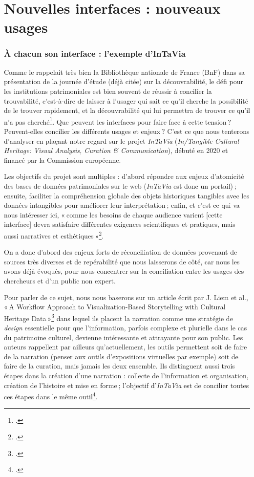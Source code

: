 \chapter{Nouvelles interfaces : nouveaux usages}

\subsection{À chacun son interface : l'exemple d'InTaVia}

Comme le rappelait très bien la Bibliothèque nationale de France (BnF) dans sa présentation de la journée d’étude (déjà citée) sur la découvrabilité, le défi pour les institutions patrimoniales est bien souvent de réussir à concilier la trouvabilité, c’est-à-dire de laisser à l’usager qui sait ce qu’il cherche la possibilité de le trouver rapidement, et la découvrabilité qui lui permettra de trouver ce qu’il n’a pas cherché\footcite{2023e}. Que peuvent les interfaces pour faire face à cette tension ? Peuvent-elles concilier les différents usages et enjeux ? C’est ce que nous tenterons d’analyser en plaçant notre regard sur le projet \textit{InTaVia} (\textit{In/Tangible Cultural Heritage: Visual Analysis, Curation \& Communication}), débuté en 2020 et financé par la Commission européenne.

Les objectifs du projet sont multiples : d’abord répondre aux enjeux d’atomicité des bases de données patrimoniales sur le web (\textit{InTaVia} est donc un portail) ; ensuite, faciliter la compréhension globale des objets historiques tangibles avec les données intangibles pour améliorer leur interprétation ; enfin, et c’est ce qui va nous intéresser ici, « comme les besoins de chaque audience varient [cette interface] devra satisfaire différentes exigences scientifiques et pratiques, mais aussi narratives et esthétiques »\footcite{noauthor_overall_nodate}.

On a donc d’abord des enjeux forts de réconciliation de données provenant de sources très diverses et de repérabilité que nous laisserons de côté, car nous les avons déjà évoqués, pour nous concentrer sur la conciliation entre les usages des chercheurs et d’un public non expert.

Pour parler de ce sujet, nous nous baserons sur un article écrit par J. Liem et al., « A Workflow Approach to Visualization-Based Storytelling with Cultural Heritage Data »\footcite{liem_workflow_2023} dans lequel ils placent la narration comme une stratégie de \textit{design} essentielle pour que l’information, parfois complexe et plurielle dans le cas du patrimoine culturel, devienne intéressante et attrayante pour son public. Les auteurs rappellent par ailleurs qu’actuellement, les outils permettent soit de faire de la narration (penser aux outils d’expositions virtuelles par exemple) soit de faire de la curation, mais jamais les deux ensemble. Ils distinguent aussi trois étapes dans la création d’une narration : collecte de l’information et organisation, création de l’histoire et mise en forme ; l’objectif d’\textit{InTaVia} est de concilier toutes ces étapes dans le même outil\footcite[introduction]{liem_workflow_2023}.

